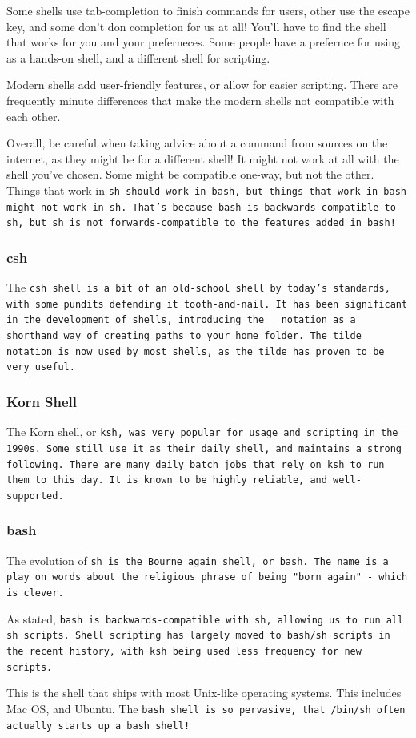 Some shells use tab-completion to finish commands for users, other use the escape key,
and some don't don completion for us at all! You'll have to find the shell that works
for you and your preferneces. Some people have a prefernce for using as a hands-on shell, and
a different shell for scripting.

 Modern shells add user-friendly features, or allow for easier scripting. There are frequently
 minute differences that make the modern shells not compatible with each other.

 Overall, be careful when taking advice about a command from sources on the internet,
 as they might be for a different shell! It might not work at all with the shell you've chosen. Some might
 be compatible one-way, but not the other. Things that work in \tt{sh} should work in \tt{bash}, but
 things that work in \tt{bash} might not work in \tt{sh}. That's because \tt{bash} is backwards-compatible
 to \tt{sh}, but \tt{sh} is not forwards-compatible to the features added in \tt{bash}!

 \subsubsection{csh}
 The \tt{csh} shell is a bit of an old-school shell by today's standards, with some
 pundits defending it tooth-and-nail. It has been significant in the development of
 shells, introducing the \tt{~} notation as a shorthand way of creating paths
 to your home folder. The tilde notation is now used by most shells, as the tilde
has proven to be very useful.

\subsubsection{Korn Shell}
The Korn shell, or \tt{ksh}, was very popular for usage and scripting in the 1990s.
Some still use it as their daily shell, and maintains a strong following. There
are many daily batch jobs that rely on \tt{ksh} to run them to this day. It is known
to be highly reliable, and well-supported.

\subsubsection{bash}

The evolution of \tt{sh} is the Bourne again shell, or \tt{bash}. The name
is a play on words about the religious phrase of being "born again" - which
is clever.

As stated, \tt{bash} is backwards-compatible with \tt{sh}, allowing us to run
all \tt{sh} scripts. Shell scripting has largely moved to \tt{bash}/\tt{sh} scripts in the
recent history, with \tt{ksh} being used less frequency for new scripts.

This is the shell that ships with most Unix-like operating systems. This includes Mac OS,
and Ubuntu.
The \tt{bash} shell is so pervasive, that \tt{/bin/sh} often actually
starts up a \tt{bash} shell!




